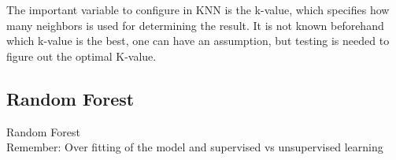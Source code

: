 \documentclass[report]{subfiles}
\begin{document}
The important variable to configure in KNN is the k-value, which specifies how many neighbors is used for determining the result. It is not known beforehand which k-value is the best, one can have an assumption, but testing is needed to figure out the optimal K-value.

\subsection{Random Forest}
Random Forest\\
Remember: Over fitting of the model and supervised vs unsupervised learning
\end{document}
